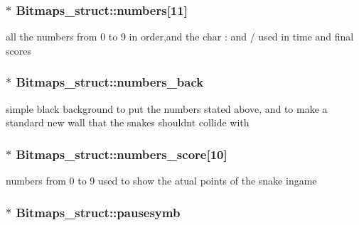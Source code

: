 \subsubsection[{\texorpdfstring{numbers}{numbers}}]{$\ast$ Bitmaps\+\_\+struct\+::numbers\mbox{[}11\mbox{]}}\hypertarget{group__graphics_ga055c85bff730277d284b6e00bb7d1b62}{}\label{group__graphics_ga055c85bff730277d284b6e00bb7d1b62}


all the numbers from 0 to 9 in order,and the char \textquotesingle{}\+:\textquotesingle{} and \textquotesingle{}/\textquotesingle{} used in time and final scores 

\subsubsection[{\texorpdfstring{numbers\+\_\+back}{numbers_back}}]{$\ast$ Bitmaps\+\_\+struct\+::numbers\+\_\+back}\hypertarget{group__graphics_ga416a4e7839cf0a547fcf830f0e5e3cf3}{}\label{group__graphics_ga416a4e7839cf0a547fcf830f0e5e3cf3}


simple black background to put the numbers stated above, and to make a standard new wall that the snakes should\textquotesingle{}nt collide with 

\subsubsection[{\texorpdfstring{numbers\+\_\+score}{numbers_score}}]{$\ast$ Bitmaps\+\_\+struct\+::numbers\+\_\+score\mbox{[}10\mbox{]}}\hypertarget{group__graphics_gac29eba55edb941d1896f1ea16ba40601}{}\label{group__graphics_gac29eba55edb941d1896f1ea16ba40601}


numbers from 0 to 9 used to show the atual points of the snake ingame 

\subsubsection[{\texorpdfstring{pausesymb}{pausesymb}}]{$\ast$ Bitmaps\+\_\+struct\+::pausesymb}\hypertarget{group__graphics_ga3b47ad4f61b00c3e5527f2bec90890b5}{}\label{group__graphics_ga3b47ad4f61b00c3e5527f2bec90890b5}


